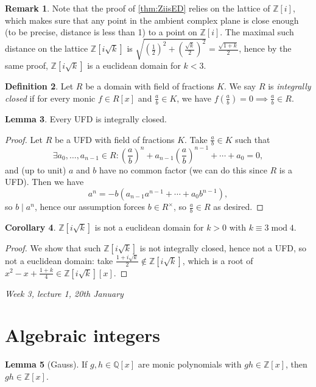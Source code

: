 \documentclass{article}
\newcommand{\Z}{\mathbb{Z}}
\newcommand{\Q}{\mathbb{Q}}
\newcommand{\Mod}{\operatorname{mod}}
\theoremstyle{definition}
\newtheorem{defn}{Definition}[subsection]
\newtheorem{lemma}[defn]{Lemma}
\newtheorem{coro}[defn]{Corollary}
\newtheorem{remark}[defn]{Remark}
\begin{document}
\begin{remark}
Note that the proof of \ref{thm:ZiisED} relies on the lattice of $\Z[i]$, which makes sure that any point in the ambient complex plane is close enough (to be precise, distance is less than 1) to a point on $\Z[i]$. The maximal such distance on the lattice $\Z\left[i\sqrt k\right]$ is $\sqrt{\left(\frac12\right)^2+\left(\frac{\sqrt k}{2}\right)^2}=\frac{\sqrt{1+k}}{2}$, hence by the same proof, $\Z\left[i\sqrt k\right]$ is a euclidean domain for $k<3$.
\end{remark}

\begin{defn}
Let $R$ be a domain with field of fractions $K$. We say $R$ is \textit{integrally closed} if for every monic $f\in R[x]$ and $\frac{a}{b}\in K$, we have $f\left(\frac{a}{b}\right)=0\implies \frac{a}{b}\in R$.
\end{defn}

\begin{lemma}
\label{lemma:UFDisintclosed}
Every UFD is integrally closed.
\end{lemma}
\begin{proof}
Let $R$ be a UFD with field of fractions $K$. Take $\frac{a}{b}\in K$ such that
\[
\exists a_0,\ldots,a_{n-1}\in R:\left(\frac{a}{b}\right)^n+a_{n-1}\left(\frac{a}{b}\right)^{n-1}+\cdots+a_0=0,
\]
and (up to unit) $a$ and $b$ have no common factor (we can do this since $R$ is a UFD). Then we have
\[
a^n=-b(a_{n-1}a^{n-1}+\cdots+a_0b^{n-1}),
\]
so $b\mid a^n$, hence our assumption forces $b\in R^\times$, so $\frac{a}{b}\in R$ as desired.
\end{proof}

\begin{coro}
$\Z\left[i\sqrt k\right]$ is not a euclidean domain for $k>0$ with $k\equiv 3\Mod 4$.
\end{coro}
\begin{proof}
We show that such $\Z\left[i\sqrt k\right]$ is not integrally closed, hence not a UFD, so not a euclidean domain: take $\frac{1+i\sqrt k}{2}\notin\Z\left[i\sqrt k\right]$, which is a root of $x^2-x+\frac{1+k}{4}\in\Z\left[i\sqrt k\right][x]$.
\end{proof}

\begin{flushright}
\textit{Week 3, lecture 1, 20th January}
\end{flushright}

\section{Algebraic integers}
\begin{lemma}[Gauss]
\label{lemma:Gauss}
If $g,h\in\Q[x]$ are monic polynomials with $gh\in\Z[x]$, then $gh\in\Z[x]$.
\end{lemma}
\end{document}
